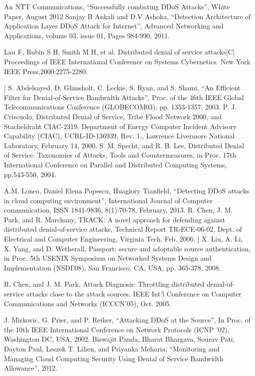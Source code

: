 \documentclass[letterpaper, 10 pt, conference]{ieeeconf}  %
\begin{document}
\begin{thebibliography}{99}

 An NTT Communications, “Successfully combating DDoS Attacks”, White Paper, August 2012
Sanjay B Ankali and D.V Ashoka, “Detection
Architecture of Application Layer DDoS Attack for
Internet”, Advanced Networking and Applications, volume
03, issue 01, Pages 984-990, 2011.

Lau F, Rubin S H, Smith M H, et al. Distributed denial of service attacks[C] Proceedings of IEEE International Conference on Systems Cybernetics. New York IEEE Press,2000:2275-2280.

 ] S. Abdelsayed, D. Glimsholt, C. Leckie, S. Ryan, and S. Shami, “An Efficient Filter for Denial-of-Service Bandwidth Attacks”, Proc. of the 46th IEEE Global Telecommunications Conference (GLOBECOM03), pp. 1353-1357, 2003.
 P. J. Criscuolo, Distributed Denial of Service, Tribe Flood Network 2000, and Stacheldraht CIAC-2319, Department of Energy Computer Incident Advisory Capability (CIAC), UCRL-ID-136939, Rev. 1., Lawrence Livermore National Laboratory, February 14, 2000.
 S. M. Specht, and R. B. Lee, Distributed Denial of Service: Taxonomies of Attacks, Tools and Countermeasures, in Proc. 17th International Conference on Parallel and Distributed Computing
Systems, pp.543-550, 2004.

A.M. Lonea, Daniel Elena Popescu, Huaglory Tianfield, “Detecting DDoS attacks in cloud computing environment”, International Journal of Computer communication, ISSN 1841-9836, 8(1):70-78, February, 2013.
R. Chen, J. M. Park, and R. Marchany, TRACK: A novel approach for defending against distributed denial-of-service attacks, Technical Report TR-ECE-06-02, Dept. of Electrical and Computer Engineering, Virginia Tech, Feb. 2006.
 ] X. Liu, A. Li, X. Yang, and D. Wetherall, Passport: secure and adoptable source authentication, in Proc. 5th USENIX Symposium
on Networked Systems Design and Implementation (NSDI’08), San Francisco, CA, USA, pp. 365-378, 2008.

 R. Chen, and J. M. Park, Attack Diagnosis: Throttling distributed denial-of-service attacks close to the attack sources, IEEE Int’l Conference on Computer Communications and Networks (ICCCN’05), Oct. 2005.

J. Mirkovic, G. Prier, and P. Reiher, “Attacking DDoS at the Source”, In Proc. of the 10th IEEE International Conference on Network Protocols (ICNP ’02), Washington DC, USA, 2002.
Biswajit Panda, Bharat Bhargava, Sourav Pati, Dayton Paul, Leszek T. Lilien, and Priyanka Meharia, “Monitoring and Managing Cloud Computing Security Using Denial of Service
Bandwidth Allowance”, 2012.


\end{thebibliography}
\end{document}
